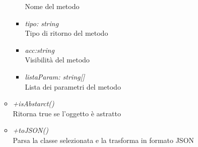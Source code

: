 \begin{itemize}
\begin{itemize}
\begin{itemize}
    			Nome del metodo
    			\item \emph{tipo: string}\\
    			Tipo di ritorno del metodo
    			\item \emph{acc:string}\\
    			Visibilità del metodo
    			\item \emph{listaParam: string[]}\\
    			Lista dei parametri del metodo
    		\end{itemize}
    		\item \emph{+isAbstarct()}\\
    		Ritorna true se l'oggetto è astratto
    		\item \emph{+toJSON()}\\
    		Parsa la classe selezionata e la trasforma in formato JSON
    	\end{itemize}
\end{itemize}